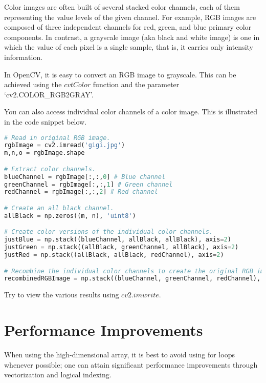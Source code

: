 \documentclass[11pt]{article}
\begin{document}
Color images are often built of several stacked color channels, each of them representing the value levels of the given channel. For example, RGB images are composed of three independent channels for red, green, and blue primary color components. In contrast, a grayscale image (aka black and white image) is one in which the value of each pixel is a single sample, that is, it carries only intensity information. 

In OpenCV, it is easy to convert an RGB image to grayscale. This can be achieved using the \href{https://docs.opencv.org/3.4/d8/d01/group__imgproc__color__conversions.html#ga397ae87e1288a81d2363b61574eb8cab}{$cvtColor$} function and the parameter `cv2.COLOR\_RGB2GRAY'.

You can also access individual color channels of a color image. This is illustrated in the code snippet below.



\begin{lstlisting}[language=python]
# Read in original RGB image.
rgbImage = cv2.imread('gigi.jpg')
m,n,o = rgbImage.shape

# Extract color channels.
blueChannel = rgbImage[:,:,0] # Blue channel
greenChannel = rgbImage[:,:,1] # Green channel
redChannel = rgbImage[:,:,2] # Red channel

# Create an all black channel.
allBlack = np.zeros((m, n), 'uint8')

# Create color versions of the individual color channels.
justBlue = np.stack((blueChannel, allBlack, allBlack), axis=2)
justGreen = np.stack((allBlack, greenChannel, allBlack), axis=2)
justRed = np.stack((allBlack, allBlack, redChannel), axis=2)

# Recombine the individual color channels to create the original RGB image again.
recombinedRGBImage = np.stack((blueChannel, greenChannel, redChannel), axis=2)
\end{lstlisting}

Try to view the various results using \href{https://docs.opencv.org/4.5.2/d4/da8/group__imgcodecs.html#gabbc7ef1aa2edfaa87772f1202d67e0ce}{$cv2.imwrite$}.


\section{Performance Improvements}
When using the high-dimensional array, it is best to avoid using for loops whenever possible; one can attain significant performance improvements through vectorization and logical indexing.
\end{document}
